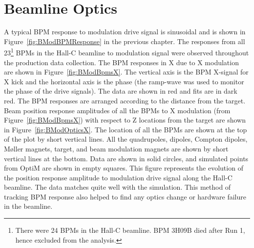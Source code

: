 \section{Beamline Optics}
\label{Beamline Optics}
A typical BPM response to modulation drive signal is sinusoidal and is shown in Figure~\ref{fig:BModBPMResponse} in the previous chapter. The responses from all 23\footnote{There were 24 BPMs in the Hall-C beamline. BPM 3H09B died after Run 1, hence excluded from the analysis.} BPMs in the Hall-C beamline to modulation signal were observed throughout the production data collection. The BPM responses in X due to X modulation are shown in Figure~\ref{fig:BModBpmsX}. The vertical axis is the BPM X-signal for X kick and the horizontal axis is the phase (the ramp-wave was used to monitor the phase of the drive signals). The data are shown in red and fits are in dark red. The BPM responses are arranged according to the distance from the target. 
Beam position response amplitudes of all the BPMs to X modulation (from Figure~\ref{fig:BModBpmsX}) with respect to Z locations from the target are shown in Figure~\ref{fig:BModOpticsX}. 
The location of all the BPMs are shown at the top of the plot by short vertical lines. All the quadrupoles, dipoles, Compton dipoles, M{\o}ller magnets, target, and beam modulation magnets are shown by short vertical lines at the bottom. Data are shown in solid circles, and simulated points from OptiM are shown in empty squares. This figure represents the evolution of the position response amplitude to modulation drive signal along the Hall-C beamline. The data matches quite well with the simulation. This method of tracking BPM response also helped to find any optics change or hardware failure in the beamline. 



